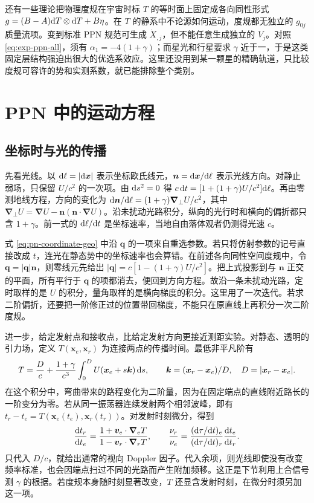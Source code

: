 还有一些理论把物理度规在宇宙时标 $T$ 的等时面上固定成各向同性形式 $g=(B-A)\dd T\otimes\dd T+B\eta$。在 $T$ 的静系中不论源如何运动，度规都无独立的 $g_{0j}$ 质量流项。变到标准 PPN 规范可生成 $\dot X_{,j}$，但不能任意生成独立的 $V_j$。对照 \eqref{eq:exp-ppn-all}，须有 $\alpha_1=-4(1+\gamma)$；而星光和行星要求 $\gamma$ 近于一，于是这类固定层结构强迫出很大的优选系效应。这里还没用到某一颗星的精确轨道，只比较度规可容许的势和实测系数，就已能排除整个类别。

\section{PPN 中的运动方程}

\subsection{坐标时与光的传播}\label{sec:pn-light}

先看光线。以 $\dd\ell=|\dd\bm x|$ 表示坐标欧氏线元，$\bm n=\dd\bm x/\dd\ell$ 表示光线方向。对静止弱场，只保留 $U/c^2$ 的一次项。由 $\dd s^2=0$ 得 $c\,\dd t=[1+(1+\gamma)U/c^2]\dd\ell$。再由零测地线方程，方向的变化为 $\dd\bm n/\dd\ell=(1+\gamma)\bm\nabla_\perp U/c^2$，其中 $\bm\nabla_\perp U=\bm\nabla U-\bm n(\bm n\cdot\bm\nabla U)$。沿未扰动光路积分，纵向的光行时和横向的偏折都只含 $1+\gamma$。前一式的 $\dd\ell/\dd t$ 是坐标速率，当地自由落体观者仍测得光速 $c$。

式 \eqref{eq:pn-coordinate-geo} 中沿 $\bm q$ 的一项来自重选参数。若只将仿射参数的记号直接改成 $t$，连光在静态势中的坐标速率也会算错。在前述各向同性空间度规中，令 $\bm q=|\bm q|\bm n$，则零线元先给出 $|\bm q|=c[1-(1+\gamma)U/c^2]$。把上式投影到与 $\bm n$ 正交的平面，所有平行于 $\bm q$ 的项都消去，便回到方向方程。故沿一条未扰动光路，定时取样的是 $U$ 的积分，量角取样的是横向梯度的积分。这里用了一次迭代。若求二阶偏折，还要把一阶修正过的位置带回梯度，不能只在原直线上再积分一次二阶度规。

进一步，给定发射点和接收点，比给定发射方向更接近测距实验。对静态、透明的引力场，定义 $T(\bm x_e,\bm x_r)$ 为连接两点的传播时间。最低非平凡阶有
\[
 T=\frac{D}{c}+\frac{1+\gamma}{c^3}\int_0^D
 U(\bm x_e+s\bm k)\,\dd s,\qquad
 \bm k=(\bm x_r-\bm x_e)/D,\quad D=|\bm x_r-\bm x_e| .
\]
在这个积分中，弯曲带来的路程变化为二阶量，因为在固定端点的直线附近路长的一阶变分为零。若从同一振荡器连续发射两个相邻波峰，即有 $t_r-t_e=T(\bm x_e(t_e),\bm x_r(t_r))$。对发射时刻微分，得到
\[
 \frac{\dd t_r}{\dd t_e}
  =\frac{1+\bm v_e\cdot\bm\nabla_e T}
         {1-\bm v_r\cdot\bm\nabla_r T},\qquad
 \frac{\nu_r}{\nu_e}=
 \frac{(\dd\tau/\dd t)_e}{(\dd\tau/\dd t)_r}\frac{\dd t_e}{\dd t_r}.
\]
只代入 $D/c$，就给出通常的视向 Doppler 因子。代入余项，则光线即使没有改变频率标准，也会因端点扫过不同的光路而产生附加频移。这正是下节利用上合信号测 $\gamma$ 的根据。若度规本身随时刻显著改变，$T$ 还显含发射时刻，在微分时须另加这一项。

